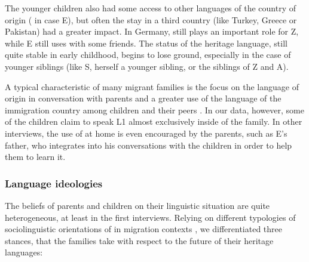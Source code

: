 \documentclass[output=paper,colorlinks,citecolor=brown]{langscibook}
\begin{document}
The younger children also had some access to other languages of the country of origin ( in case E), but often the stay in a third country (like Turkey, Greece or Pakistan) had a greater impact. In Germany,  still plays an important role for Z, while E still uses  with some friends. The status of the heritage language, still quite stable in early childhood, begins to lose ground, especially in the case of younger siblings (like S, herself a younger sibling, or the siblings of Z and A).

A typical characteristic of many migrant families is the focus on the language of origin in conversation with parents and a greater use of the language of the immigration country among children and their peers \citep{portes_fernandez-kelly_haller2009,kempert_et_al2016}. In our data, however, some of the children claim to speak L1 almost exclusively inside of the family. In other interviews, the use of  at home is even encouraged by the parents, such as E's father, who integrates  into his conversations with the children in order to help them to learn it.

\subsubsection{Language ideologies}

The beliefs of parents and children on their linguistic situation are quite heterogeneous, at least in the first interviews. Relying on different typologies of sociolinguistic orientations of  in migration contexts \citep{berry1997,brizic2021,brizic_bulut_simsek2021}, we differentiated three stances, that the families take with respect to the future of their heritage languages: 
\end{document}
